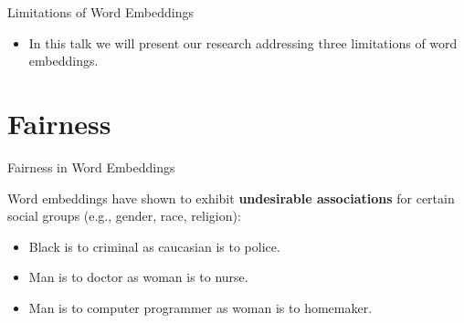 \documentclass[handout]{beamer}
\begin{document}
\begin{frame}{Limitations of Word Embeddings}
\begin{scriptsize}
\begin{itemize}


\item In this talk we will present our research addressing three limitations of word embeddings.





\end{itemize}
\end{scriptsize}
\end{frame}

\section{Fairness}


\begin{frame}{Fairness in Word Embeddings}
\begin{scriptsize}
 Word embeddings have shown to exhibit \textbf{undesirable associations} for certain social groups (e.g., gender, race, religion):
\begin{itemize}
\item Black is to criminal as caucasian is to police.
\item Man is to doctor as woman is to nurse.
\item Man is to computer programmer as woman is to homemaker.
\end{itemize}


\end{scriptsize}
\end{frame}
\end{document}
